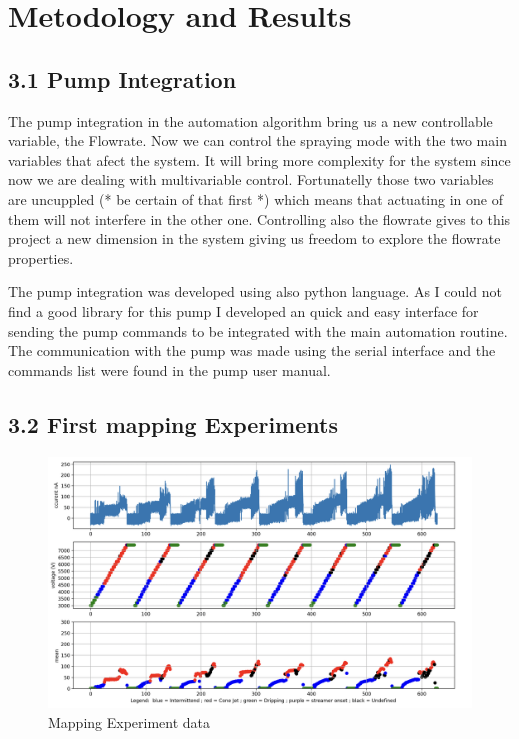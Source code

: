 \section{Metodology and Results}



\subsection*{3.1 Pump Integration}

    The pump integration in the automation algorithm bring us a new controllable variable, the Flowrate. Now we can control the spraying mode with the
    two main variables that afect the system. 
    It will bring more complexity for the system since now we are dealing with multivariable control.
    Fortunatelly those two variables are uncuppled (* be certain of that first *) which means that actuating in one of them will not interfere in the other one.
    Controlling also the flowrate gives to this project a new dimension in the system giving us freedom to explore the flowrate properties.

    The pump integration was developed using also python language. As I could not find a good library for this pump I developed an quick and easy interface for sending the pump
    commands to be integrated with the main automation routine. The communication with the pump was made using the serial interface and the commands list were found in the pump user manual.


\subsection*{3.2 First mapping Experiments}


    \begin{figure}[H]
        \center
        \includegraphics[width=15cm]{images/map2Data.png}
        \caption{Mapping Experiment data}
    \end{figure}

